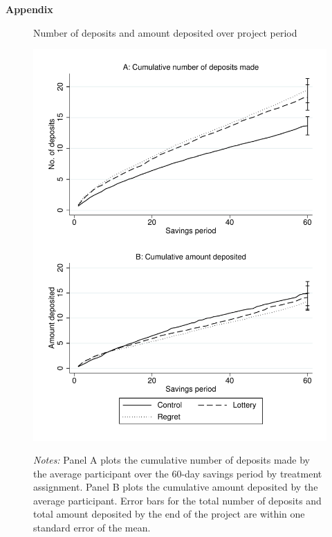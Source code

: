 \documentclass[12pt]{article}
\begin{document}



\newpage

\textbf{Appendix}

	
	
	
	
	
	
	

	\clearpage

	\begin{figure}[h]
		\centering
		\caption{Number of deposits and amount deposited over project period}
		\includegraphics[height=0.85\textheight]{../../figures/line-cumdeposits.pdf}
		\label{fig:line-cumdeposits}
		\caption*{\footnotesize \emph{Notes:} Panel A plots the cumulative number of deposits made by the average participant over the 60-day savings period by treatment assignment. Panel B plots the cumulative amount deposited by the average participant. Error bars for the total number of deposits and total amount deposited by the end of the project are within one standard error of the mean.}
	\end{figure}
\end{document}
